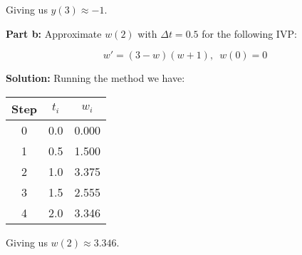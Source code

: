 \documentclass{article}
\begin{document}
Giving us $y(3)\approx-1$.

\bigskip

\noindent\textbf{Part b:} Approximate $w(2)$ with $\Delta t=0.5$ for the following IVP:

\begin{equation*}
    w'=(3-w)(w+1),\,\,\,w(0)=0
\end{equation*}
\smallskip

\noindent\textbf{Solution:} Running the method we have:

\begin{center}
\begin{tabular}{c|c|c}
        Step & $t_i$ & $w_i$\\
        \hline
        0 & 0.0 & 0.000\\
        1 & 0.5 & 1.500\\
        2 & 1.0 & 3.375\\
        3 & 1.5 & 2.555\\
        4 & 2.0 & 3.346\\
\end{tabular}
\end{center}

Giving us $w(2)\approx3.346$.
\end{document}
